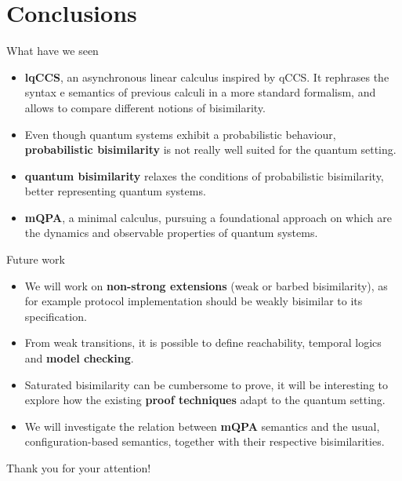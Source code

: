 \documentclass{beamer}
\begin{document}
\section{Conclusions}
\begin{frame}{What have we seen}
\begin{itemize}
\item<2-> \textbf{lqCCS}, an asynchronous linear calculus inspired by  qCCS. It rephrases the syntax e semantics of previous calculi in a more standard formalism, and allows to compare different notions of bisimilarity. 
\item<3-> Even though quantum systems exhibit a probabilistic behaviour, \textbf{probabilistic bisimilarity} is not really well suited for the quantum setting. 
\item<4-> \textbf{quantum bisimilarity} relaxes the conditions of probabilistic bisimilarity, better representing quantum systems.
\item<4-> \textbf{mQPA}, a minimal calculus, pursuing a foundational approach on which are the dynamics and observable properties of quantum systems.
\end{itemize}
\end{frame}


\begin{frame}{Future work}
\begin{itemize}
\item<2-> We will work on \textbf{non-strong extensions} (weak or barbed bisimilarity), as for example protocol implementation should be weakly bisimilar to its specification.
\item<3->  From weak transitions, it is possible to define reachability, temporal logics and \textbf{model checking}.
\item<4->  Saturated bisimilarity can be cumbersome to prove, it will be interesting to explore how the existing \textbf{proof techniques} adapt to the quantum setting.
\item<5->  We will investigate the relation between \textbf{mQPA} semantics and the usual, configuration-based semantics, together with their respective bisimilarities.
\end{itemize}
\end{frame}

\begin{frame}
\bigskip
\begin{Large}
\begin{center}
Thank you for your attention!
\end{center}
\end{Large}
\end{frame}
\end{document}
